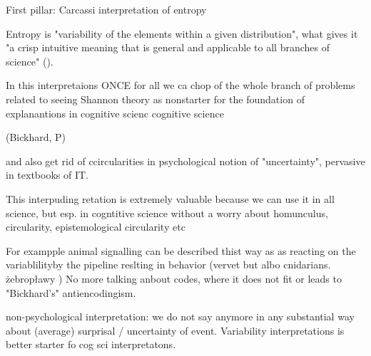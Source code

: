 \documentclass[10pt, aspectratio=169]{beamer}
\begin{document}
\begin{frame} {First pillar: Carcassi interpretation of entropy}

Entropy is "variability of the elements within a given distribution", what gives it "a crisp intuitive meaning that is general and applicable to all branches of science" (\cite{carcassi_variability_2021}).

In this interpretaions ONCE for all we ca chop of the whole branch of problems related to seeing Shannon theory as nonstarter for the foundation of explanantions in cognitive scienc  cognitive science

(Bickhard, P)

and also get rid of ccircularities in psychological notion of "uncertainty", pervasive in textbooks of IT.

This interpuding retation is extremely valuable because we can use it in all science, but esp. in cogntitive science without a worry about homunculus, circularity, epistemological circularity etc

For exampple animal signalling can be described thist way as as reacting on the variablilityby the pipeline reslting in behavior (vervet but albo cnidarians. żebropławy )
No more talking anbout codes, where it does not fit or leads to "Bickhard's" antiencodingism. 

non-psychological interpretation: we do not say anymore in any substantial way about (average) surprisal / uncertainty of event.
Variability interpretations is better starter fo cog sci interpretatons.
 

\end{frame}
\end{document}
